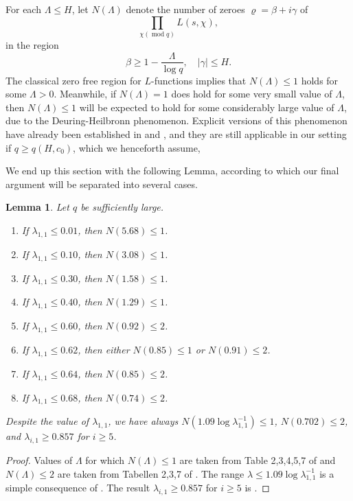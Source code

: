 \documentclass[10pt, reqno]{amsart}
\numberwithin{equation}{section}
\newtheorem{lemma}[theorem]{Lemma}
\renewcommand{\mod }{\operatorname{mod}}
\renewcommand{\rho }{\operatorname{\varrho}}
\begin{document}
For each $\Lambda\leq H$, let $N(\Lambda)$ denote the number of zeroes $\rho=\beta+i\gamma$ of
\begin{equation}\label{eq:Mq}
\prod_{\chi (\mod q)}L(s,\chi),
\end{equation}
in the region
\begin{equation}\label{eq:Region}
\beta\geq 1-\frac{\Lambda}{\log q},\quad |\gamma| \leq H.
\end{equation}
The classical zero free region for $L$-functions implies that $N(\Lambda)\leq 1$ holds for some $\Lambda>0$. Meanwhile, if $N(\Lambda)=1$ does hold for some very small value of $\Lambda$, then $N(\Lambda)\leq 1$ will be expected to hold for some considerably large value of $\Lambda$, due to the Deuring-Heilbronn phenomenon. Explicit versions of this phenomenon have already been established in \cite{Heath-Brown} and \cite{Xylouris}, and they are still applicable in our setting if  $q\geq q(H,c_0)$, which we henceforth assume,

We end up this section with the following Lemma, according to which our final argument will be separated into several cases.

\begin{lemma}\label{lem:Cases}
Let $q$ be sufficiently large.
\begin{enumerate}[(1)]
\item If $\lambda_{1,1}\leq 0.01$, then $N(5.68)\leq 1$.
\item If $\lambda_{1,1}\leq 0.10$, then $N(3.08)\leq 1$.
\item If $\lambda_{1,1}\leq 0.30$, then $N(1.58)\leq 1$.
\item If $\lambda_{1,1}\leq 0.40$, then $N(1.29)\leq 1$.
\item If $\lambda_{1,1}\leq 0.60$, then $N(0.92)\leq 2$.
\item If $\lambda_{1,1}\leq 0.62$, then either $N(0.85)\leq 1$ or $N(0.91)\leq 2$.
\item If $\lambda_{1,1}\leq 0.64$, then $N(0.85)\leq 2$.
\item If $\lambda_{1,1}\leq 0.68$, then $N(0.74)\leq 2$.
\end{enumerate}
Despite the value of $\lambda_{1,1}$, we have always $N(1.09\log\lambda_{1,1}^{-1})\leq 1$, $N(0.702)\leq 2$, and $\lambda_{i,1}\geq 0.857$ for $i\geq 5$.
\end{lemma}

\begin{proof}
Values of $\Lambda$ for which $N(\Lambda)\leq 1$ are taken from Table 2,3,4,5,7 of \cite{Heath-Brown} and $N(\Lambda)\leq 2$ are taken from Tabellen 2,3,7 of \cite{Xylouris}. The range $\lambda\leq 1.09 \log \lambda_{1,1}^{-1}$ is a simple consequence of \cite[Lemma 8.8]{Heath-Brown}. The result $\lambda_{i,1}\geq 0.857$ for $i\geq 5$ is \cite[Theorem 3]{Heath-Brown}.
\end{proof}
\end{document}
